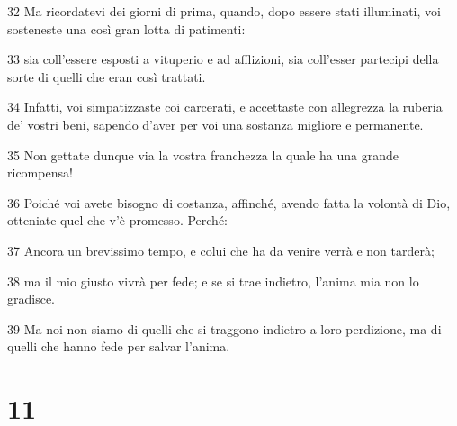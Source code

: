 \par 32 Ma ricordatevi dei giorni di prima, quando, dopo essere stati illuminati, voi sosteneste una così gran lotta di patimenti:
\par 33 sia coll'essere esposti a vituperio e ad afflizioni, sia coll'esser partecipi della sorte di quelli che eran così trattati.
\par 34 Infatti, voi simpatizzaste coi carcerati, e accettaste con allegrezza la ruberia de' vostri beni, sapendo d'aver per voi una sostanza migliore e permanente.
\par 35 Non gettate dunque via la vostra franchezza la quale ha una grande ricompensa!
\par 36 Poiché voi avete bisogno di costanza, affinché, avendo fatta la volontà di Dio, otteniate quel che v'è promesso. Perché:
\par 37 Ancora un brevissimo tempo, e colui che ha da venire verrà e non tarderà;
\par 38 ma il mio giusto vivrà per fede; e se si trae indietro, l'anima mia non lo gradisce.
\par 39 Ma noi non siamo di quelli che si traggono indietro a loro perdizione, ma di quelli che hanno fede per salvar l'anima.

\chapter{11}


